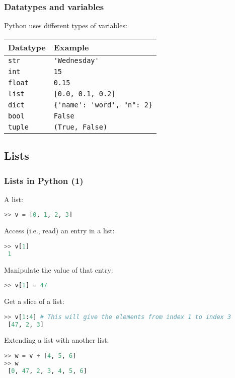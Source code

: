 \begin{frame}[fragile]
  \frametitle{Datatypes and variables}
  Python uses different types of variables:
      \begin{longtable}{l!{\vrule}l}
       Datatype        & Example \\ \hline
       \lstinline$str$    & \lstinline$'Wednesday'$ \\
       \lstinline$int$    & \lstinline$15$ \\
       \lstinline$float$  & \lstinline$0.15$ \\
       \lstinline$list$   & \lstinline$[0.0, 0.1, 0.2]$ \\
       \lstinline$dict$   & \lstinline${'name': 'word', "n": 2}$ \\
       \lstinline$bool$   & \lstinline$False$ \\
       \lstinline$tuple$  & \lstinline$(True, False)$ \\
     \end{longtable}
 \end{frame}


 \subsection*{Lists}
 \begin{frame}[fragile]
   \frametitle{Lists in Python (1)}
   A list:
   \begin{lstlisting}[language=Python,numbers=none]
>> v = [0, 1, 2, 3]
   \end{lstlisting}\pause
   Access (i.e., read) an entry in a list:
   \begin{lstlisting}[language=Python,numbers=none]
>> v[1]
 1
   \end{lstlisting}\pause
   Manipulate the value of that entry:
   \begin{lstlisting}[language=Python,numbers=none]
>> v[1] = 47
   \end{lstlisting}\pause
   Get a slice of a list:
   \begin{lstlisting}[language=Python,numbers=none]
>> v[1:4] # This will give the elements from index 1 to index 3
 [47, 2, 3]
   \end{lstlisting}\pause
   Extending a list with another list:
   \begin{lstlisting}[language=Python,numbers=none]
>> w = v + [4, 5, 6]
>> w
 [0, 47, 2, 3, 4, 5, 6]
   \end{lstlisting}
 \end{frame}
 
